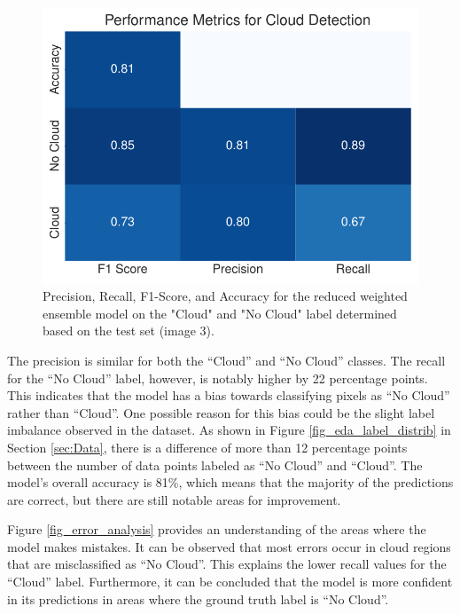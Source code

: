 \documentclass[11pt,letterpaper]{article}
\begin{document}
\begin{figure}[H]
    \centering
    \includegraphics[width=0.9\linewidth]{figs/post_hoc_eda.pdf}
    \caption{Precision, Recall, F1-Score, and Accuracy for the reduced weighted ensemble model on the "Cloud" and "No Cloud" label determined based on the test set (image 3).}
    \label{fig_classification_metrics}
\end{figure}

The precision is similar for both the ``Cloud'' and ``No Cloud'' classes. The recall for the ``No Cloud'' label, however, is notably higher by 22 percentage points. This indicates that the model has a bias towards classifying pixels as ``No Cloud'' rather than ``Cloud''. One possible reason for this bias could be the slight label imbalance observed in the dataset. As shown in Figure \ref{fig_eda_label_distrib} in Section \ref{sec:Data}, there is a difference of more than 12 percentage points between the number of data points labeled as ``No Cloud'' and ``Cloud''. The model's overall accuracy is 81\%, which means that the majority of the predictions are correct, but there are still notable areas for improvement.

Figure \ref{fig_error_analysis} provides an understanding of the areas where the model makes mistakes. It can be observed that most errors occur in cloud regions that are misclassified as ``No Cloud''. This explains the lower recall values for the ``Cloud'' label. Furthermore, it can be concluded that the model is more confident in its predictions in areas where the ground truth label is ``No Cloud''.
\end{document}
